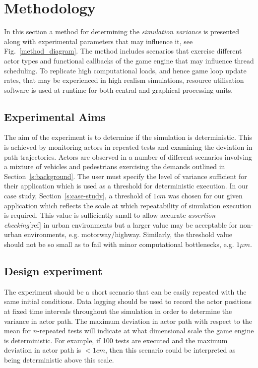 \section{Methodology} \label{s:methodology}

In this section a method for determining the \textit{simulation variance} is presented along with experimental parameters that may influence it, see Fig.~\ref{method_diagram}. The method includes scenarios that exercise different actor types and functional callbacks of the game engine that may influence thread scheduling. To replicate high computational loads, and hence game loop update rates, that may be experienced in high realism simulations, resource utilisation software is used at runtime for both central and graphical processing units.

\subsection{Experimental Aims}
The aim of the experiment is to determine if the simulation is deterministic. This is achieved by monitoring actors in repeated tests and examining the deviation in path trajectories. Actors are observed in a number of different scenarios involving a mixture of vehicles and pedestrians exercising the demands outlined in Section~\ref{s:background}. The user must specify the level of variance sufficient for their application which is used as a threshold for deterministic execution. In our case study, Section~\ref{s:case-study}, a threshold of $1cm$ was chosen for our given application which reflects the scale at which repeatability of simulation execution is required. This value is sufficiently small to allow accurate \textit{assertion checking}[ref] in urban environments but a larger value may be acceptable for non-urban environments, e.g. motorway/highway. Similarly, the threshold value should not be so small as to fail with minor computational bottlenecks, e.g. $1\mu m$. 

\subsection{Design experiment}
The experiment should be a short scenario that can be easily repeated with the same initial conditions. Data logging should be used to record the actor positions at fixed time intervals throughout the simulation in order to determine the variance in actor path. 
The maximum deviation in actor path with respect to the mean for $n$-repeated tests will indicate at what dimensional scale the game engine is deterministic. For example, if 100 tests are executed and the maximum deviation in actor path is $<1cm$, then this scenario could be interpreted as being deterministic above this scale. 

